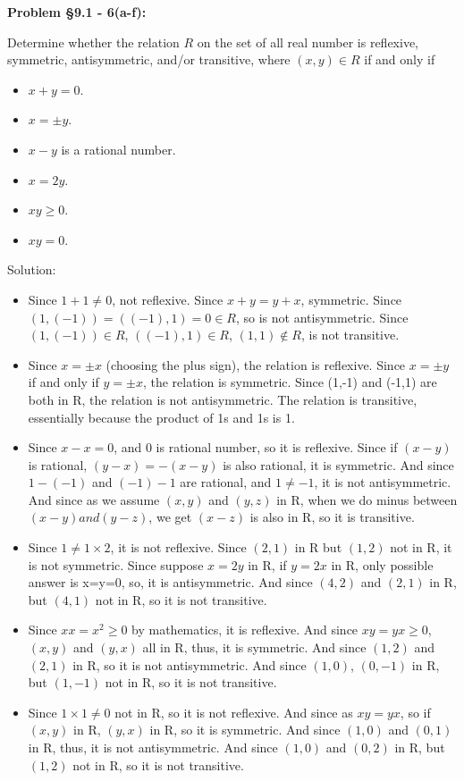 \documentclass{article}
\newenvironment{problem}[1]
{\begin{mdframed}[default]
\textbf{Problem #1:}
}
{\end{mdframed}
}
\begin{document}
\begin{problem}{\S 9.1 - 6(a-f)}
Determine whether the relation $R$ on the set of all real number is reflexive,
symmetric, antisymmetric, and/or transitive, where $(x,y) \in R$ if and only if
\begin{itemize}
\item[(a)] $x+y = 0$.
\item[(b)] $x = \pm y$.
\item[(c)] $x-y$ is a rational number.
\item[(d)] $x = 2y$.
\item[(e)] $xy \geq 0$.
\item[(f)] $xy = 0$.
\end{itemize}

Solution:
\begin{itemize}
\item[(a)] Since $1+1\neq0$, not reflexive. Since $x+y=y+x$, symmetric. Since $(1,(-1))=((-1),1)=0\in R$, so is not antisymmetric. Since $(1,(-1))\in R$, $((-1),1)\in R$, $(1,1)\notin R$, is not transitive.
\item[(b)] Since $x = \pm x$ (choosing the plus sign), the relation is reflexive. Since $x = \pm y$ if and only if $y =\pm x$,
the relation is symmetric. Since (1,-1) and (-1,1) are both in R, the relation is not antisymmetric. The
relation is transitive, essentially because the product of 1s and 1s is 1.
\item[(c)] Since $x-x=0$, and 0 is rational number, so it is reflexive. Since if $(x-y)$ is rational, $(y-x)=-(x-y)$ is also rational, it is symmetric. And since $1-(-1)$ and $(-1)-1$ are rational, and $1\neq -1$, it is not antisymmetric. And since as we assume $(x,y)$ and $(y,z)$ in R, when we do minus between $(x-y) and (y-z)$, we get $(x-z)$ is also in R, so it is transitive.
\item[(d)] Since $1\neq 1\times 2$, it is not reflexive. Since $(2,1)$ in R but $(1,2)$ not in R, it is not symmetric. Since suppose $x=2y$ in R, if $y=2x$ in R, only possible answer is x=y=0, so, it is antisymmetric. And since $(4,2)$ and $(2,1)$ in R, but $(4,1)$ not in R, so it is not transitive.
\item[(e)] Since $xx=x^2\geq 0$ by mathematics, it is reflexive. And since $xy=yx\geq 0$, $(x,y)$ and $(y,x)$ all in R, thus, it is symmetric. And since $(1,2)$ and $(2,1)$ in R, so it is not antisymmetric. And since $(1,0)$, $(0,-1)$ in R, but $(1,-1)$ not in R, so it is not transitive.
\item[(f)] Since $1\times 1 \neq 0$ not in R, so it is not reflexive. And since as $xy=yx$, so if $(x,y)$ in R, $(y,x)$ in R, so it is symmetric. And since $(1,0)$ and $(0,1)$ in R, thus, it is not antisymmetric. And since $(1,0)$ and $(0,2)$ in R, but $(1,2)$ not in R, so it is not transitive.
\end{itemize}

\end{problem}
\end{document}
